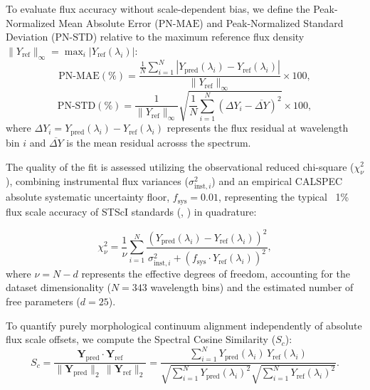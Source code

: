 \documentclass{aa}
\begin{document}
To evaluate flux accuracy without scale-dependent bias, we define the Peak-Normalized Mean Absolute Error ($\text{PN-MAE}$) and Peak-Normalized Standard Deviation ($\text{PN-STD}$) relative to the maximum reference flux density $\|Y_{\text{ref}}\|_{\infty} = \max_i |Y_{\text{ref}}(\lambda_i)|$:
\begin{equation}
    \text{PN-MAE} (\%) = \frac{\frac{1}{N} \sum_{i=1}^{N} |Y_{\text{pred}}(\lambda_i) - Y_{\text{ref}}(\lambda_i)|}{\|Y_{\text{ref}}\|_{\infty}} \times 100,
\end{equation}
\begin{equation}
    \text{PN-STD} (\%) = \frac{1}{\|Y_{\text{ref}}\|_{\infty}} \sqrt{\frac{1}{N} \sum_{i=1}^{N} \left( \Delta Y_i - \overline{\Delta Y} \right)^2} \times 100,
\end{equation}
where $\Delta Y_i = Y_{\text{pred}}(\lambda_i) - Y_{\text{ref}}(\lambda_i)$ represents the flux residual at wavelength bin $i$ and $\overline{\Delta Y}$ is the mean residual acrosss the spectrum.

The quality of the fit is assessed utilizing the observational reduced chi-square ($\chi^2_\nu$), combining instrumental flux variances ($\sigma_{\text{inst}, i}^2$) and an empirical CALSPEC absolute systematic uncertainty floor, $f_{\text{sys}} = 0.01$, representing the typical ~1\% flux scale accuracy of STScI standards (\citealt{bohlin2014}, \citeyear{bohlin2020}) in quadrature:

\begin{equation}
    \chi^2_{\nu} = \frac{1}{\nu} \sum_{i=1}^{N} \frac{\left(Y_{\text{pred}}(\lambda_i) - Y_{\text{ref}}(\lambda_i)\right)^2}{\sigma_{\text{inst}, i}^2 + \left(f_{\text{sys}} \cdot Y_{\text{ref}}(\lambda_i)\right)^2},
\end{equation}
where $\nu = N - d$ represents the effective degrees of freedom, accounting for the dataset dimensionality ($N = 343$ wavelength bins) and the estimated number of free parameters ($d=25$).

To quantify purely morphological continuum alignment independently of absolute flux scale offsets, we compute the Spectral Cosine Similarity ($S_c$):
\begin{equation}
    S_c = \frac{\mathbf{Y}_{\text{pred}} \cdot \mathbf{Y}_{\text{ref}}}{\|\mathbf{Y}_{\text{pred}}\|_2 \, \|\mathbf{Y}_{\text{ref}}\|_2} = \frac{\sum_{i=1}^{N} Y_{\text{pred}}(\lambda_i) \, Y_{\text{ref}}(\lambda_i)}{\sqrt{\sum_{i=1}^{N} Y_{\text{pred}}(\lambda_i)^2} \sqrt{\sum_{i=1}^{N} Y_{\text{ref}}(\lambda_i)^2}}.
\end{equation}
\end{document}
